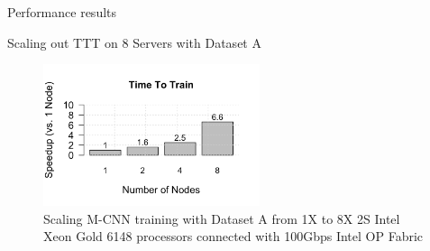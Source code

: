 \begin{section}{Performance results}
\begin{subsection}{Scaling out TTT on 8 Servers with Dataset A}
\begin{figure}
	\centering
	\includegraphics[width=2.5in]{wgrid_figure6.png}
	\caption{\textsf{Scaling M-CNN training with Dataset A from 1X to 8X 2S Intel\textregistered{} Xeon\textregistered{} Gold 6148 processors connected with 100Gbps Intel\textregistered{} OP Fabric}}
	\label{fig:scaleout_dataset1}
\end{figure}
\end{subsection}


\end{section}
